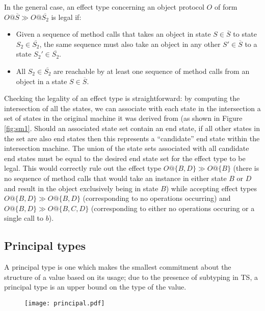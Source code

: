 \documentclass[preprint]{sigplanconf}
\newcommand{\figref}[1]{Figure \ref{#1}}
\begin{document}
In the general case, an effect type concerning an object protocol $O$
of form $O@\overline{S} \gg O@\overline{S_2}$ is
legal if:

\begin{itemize}
\item Given a sequence of method calls that takes an object in state $S \in \overline{S}$
to state $S_2 \in \overline{S_2}$, the same sequence must also take an object
in any other $S' \in \overline{S}$ to a state $S_2' \in \overline{S_2}$.
\item All $S_2 \in \overline{S_2}$ are reachable by at least one sequence
of method calls from an object in a state $S \in \overline{S}$.
\end{itemize}

Checking the legality of an effect type is straightforward: by computing the
intersection of all the states, we can associate with each state in the 
intersection a set of states in the original machine
it was derived from (as shown in \figref{fig:sm1}. 
Should an associated state set contain an end state,
if all other states in the set are also end states then this represents a
``candidate'' end state within the intersection machine. The union of the state 
sets associated with all candidate end states must be equal to the
desired end state set for the effect type to be legal. This would correctly rule 
out the effect type $O@\{B,D\} \gg O@\{B\}$ (there is no sequence of method
calls that would take an instance in either state $B$ or $D$ and result in
the object exclusively being in state $B$) while accepting effect types
$O@\{B,D\} \gg O@\{B,D\}$ (corresponding to no operations occurring) and
$O@\{B,D\} \gg O@\{B,C,D\}$ (corresponding to either no operations occuring
or a single call to $b$).

\subsection{Principal types}

A principal type is one which makes the smallest commitment about 
the structure of a value based on its usage; due to the presence of subtyping 
in TS, a principal type is an upper bound on the type of the value.

\begin{figure}
\texttt{[image: principal.pdf]}
\caption{\label{fig:principalex}}
\end{figure}
\end{document}
